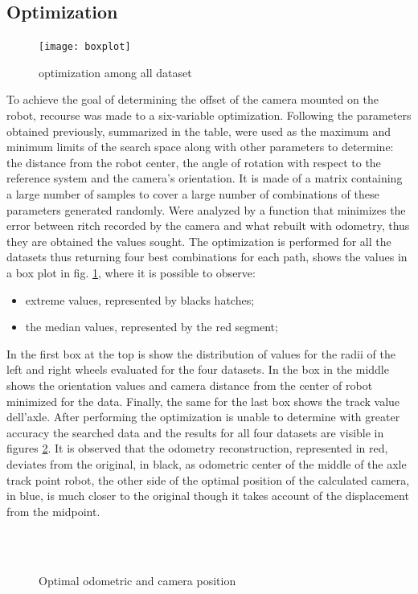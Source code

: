\subsection{Optimization}
\begin{figure}[htb]
\centering
\texttt{[image: boxplot]}
\caption{optimization among all dataset}
\label{fig:boxplot}
\end{figure}
To achieve the goal of determining the offset of the camera mounted on the robot, recourse was made to a six-variable optimization. Following the parameters obtained previously, summarized in the table, were used as the maximum and minimum limits of the search space along with other parameters to determine: the distance from the robot center, the angle of rotation with respect to the reference system and the camera's orientation.
It is made of a matrix containing a large number of samples to cover a large number of combinations of these parameters generated randomly.
Were analyzed by a function that minimizes the error between ritch recorded by the camera and what rebuilt with odometry, thus they are obtained the values sought.
The optimization is performed for all the datasets thus returning four best combinations for each path, shows the values in a box plot in fig.  \ref{fig:boxplot}, where it is possible to observe:
\begin{itemize}
\item extreme values, represented by blacks hatches;
\item the median values, represented by the red segment;
\end{itemize}
\pagebreak
In the first box at the top is show the distribution of values for the radii of the left and right wheels evaluated for the four datasets.
In the box in the middle shows the orientation values and camera distance from the center of robot minimized for the data. 
Finally, the same for the last box shows the track value dell'axle.
After performing the optimization is unable to determine with greater accuracy the searched data and the results for all four datasets are visible in figures \ref{fig:OptiOdo}.
It is observed that the odometry reconstruction, represented in red, deviates from the original, in black, as odometric center of the middle of the axle track point robot, the other side of the optimal position of the calculated camera, in blue, is much closer to the original though it takes account of the displacement from the midpoint.
\begin{figure}[!h]
 \,
 \\
 \,
\caption{Optimal odometric and camera position}
\label{fig:OptiOdo}
\end{figure}
